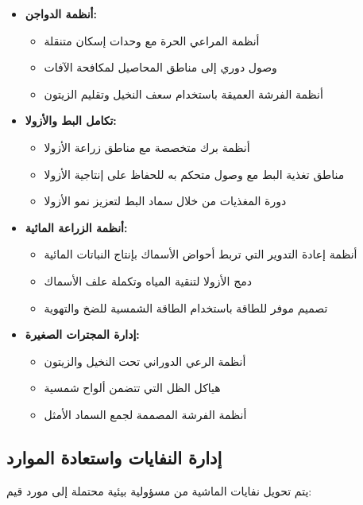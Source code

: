 \begin{itemize}
    \item \textbf{أنظمة الدواجن:}
    \begin{itemize}
        \item أنظمة المراعي الحرة مع وحدات إسكان متنقلة
        \item وصول دوري إلى مناطق المحاصيل لمكافحة الآفات
        \item أنظمة الفرشة العميقة باستخدام سعف النخيل وتقليم الزيتون
    \end{itemize}
    
    \item \textbf{تكامل البط والأزولا:}
    \begin{itemize}
        \item أنظمة برك متخصصة مع مناطق زراعة الأزولا
        \item مناطق تغذية البط مع وصول متحكم به للحفاظ على إنتاجية الأزولا
        \item دورة المغذيات من خلال سماد البط لتعزيز نمو الأزولا
    \end{itemize}
    
    \item \textbf{أنظمة الزراعة المائية:}
    \begin{itemize}
        \item أنظمة إعادة التدوير التي تربط أحواض الأسماك بإنتاج النباتات المائية
        \item دمج الأزولا لتنقية المياه وتكملة علف الأسماك
        \item تصميم موفر للطاقة باستخدام الطاقة الشمسية للضخ والتهوية
    \end{itemize}
    
    \item \textbf{إدارة المجترات الصغيرة:}
    \begin{itemize}
        \item أنظمة الرعي الدوراني تحت النخيل والزيتون
        \item هياكل الظل التي تتضمن ألواح شمسية
        \item أنظمة الفرشة المصممة لجمع السماد الأمثل
    \end{itemize}
\end{itemize}

\subsection{إدارة النفايات واستعادة الموارد}

يتم تحويل نفايات الماشية من مسؤولية بيئية محتملة إلى مورد قيم:

